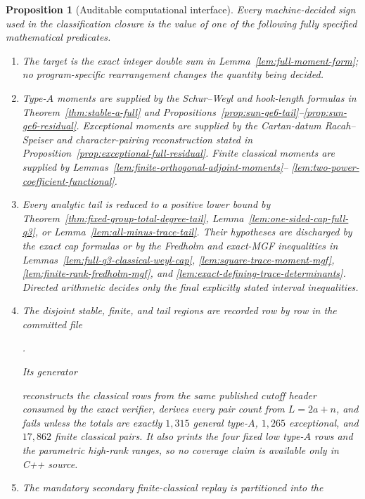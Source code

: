 \documentclass[11pt,reqno]{amsart}
\theoremstyle{plain}
\newtheorem{proposition}[theorem]{Proposition}
\theoremstyle{definition}
\begin{document}
\begin{proposition}[Auditable computational interface]
\label{prop:consolidated-computational-interface}
Every machine-decided sign used in the classification closure is the value of
one of the following fully specified mathematical predicates.
\begin{enumerate}
\item The target is the exact integer double sum in
Lemma~\ref{lem:full-moment-form}; no program-specific rearrangement changes
the quantity being decided.
\item Type-$A$ moments are supplied by the Schur--Weyl and hook-length
formulas in Theorem~\ref{thm:stable-a-full} and
Propositions~\ref{prop:sun-ge6-tail}--\ref{prop:sun-ge6-residual}.
Exceptional moments are supplied by the Cartan-datum Racah--Speiser and
character-pairing reconstruction stated in
Proposition~\ref{prop:exceptional-full-residual}.
Finite classical moments are supplied by
Lemmas~\ref{lem:finite-orthogonal-adjoint-moments}--
\ref{lem:two-power-coefficient-functional}.
\item Every analytic tail is reduced to a positive lower bound by
Theorem~\ref{thm:fixed-group-total-degree-tail},
Lemma~\ref{lem:one-sided-cap-full-q3}, or
Lemma~\ref{lem:all-minus-trace-tail}.  Their hypotheses are discharged by
the exact cap formulas or by the Fredholm and exact-MGF inequalities in
Lemmas~\ref{lem:full-q3-classical-weyl-cap},
\ref{lem:square-trace-moment-mgf},
\ref{lem:finite-rank-fredholm-mgf}, and
\ref{lem:exact-defining-trace-determinants}.  Directed arithmetic decides
only the final explicitly stated interval inequalities.
\item The disjoint stable, finite, and tail regions are recorded row by row
in the committed file
\begin{center}
\small{}.
\end{center}
Its generator
\begin{center}
\small{}
\end{center}
reconstructs the classical
rows from the same published cutoff header consumed by the exact verifier,
derives every pair count from \(L=2a+n\), and fails unless the totals are
exactly $1{,}315$ general type-$A$, $1{,}265$ exceptional, and $17{,}862$
finite classical pairs.  It also prints the four fixed low type-$A$ rows and
the parametric high-rank ranges, so no coverage claim is available only in
C++ source.
\item The mandatory secondary finite-classical replay is partitioned into the

\end{enumerate}
\end{proposition}
\end{document}
